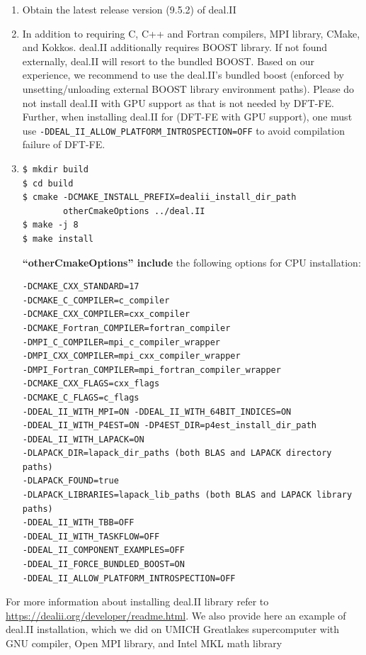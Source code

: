 \begin{enumerate}

\item Obtain the latest release version (9.5.2) of deal.II

\item In addition to requiring C, C++ and Fortran compilers, MPI library, CMake, and Kokkos. deal.II additionally requires BOOST library. If not found externally, deal.II will resort to the bundled BOOST. Based on our experience, we recommend to use the deal.II's bundled boost (enforced by unsetting/unloading external BOOST library environment paths). Please do not install deal.II with GPU support as that is not needed by DFT-FE. Further, when installing deal.II for (DFT-FE with GPU support), one must use \verb|-DDEAL_II_ALLOW_PLATFORM_INTROSPECTION=OFF| to avoid compilation failure of DFT-FE.

\item
\begin{verbatim}
$ mkdir build
$ cd build
$ cmake -DCMAKE_INSTALL_PREFIX=dealii_install_dir_path
        otherCmakeOptions ../deal.II
$ make -j 8        
$ make install
\end{verbatim}
{\bf ``otherCmakeOptions'' include} the following options for CPU installation:
\begin{verbatim}
-DCMAKE_CXX_STANDARD=17
-DCMAKE_C_COMPILER=c_compiler
-DCMAKE_CXX_COMPILER=cxx_compiler
-DCMAKE_Fortran_COMPILER=fortran_compiler
-DMPI_C_COMPILER=mpi_c_compiler_wrapper
-DMPI_CXX_COMPILER=mpi_cxx_compiler_wrapper
-DMPI_Fortran_COMPILER=mpi_fortran_compiler_wrapper
-DCMAKE_CXX_FLAGS=cxx_flags
-DCMAKE_C_FLAGS=c_flags
-DDEAL_II_WITH_MPI=ON -DDEAL_II_WITH_64BIT_INDICES=ON
-DDEAL_II_WITH_P4EST=ON -DP4EST_DIR=p4est_install_dir_path
-DDEAL_II_WITH_LAPACK=ON
-DLAPACK_DIR=lapack_dir_paths (both BLAS and LAPACK directory paths)
-DLAPACK_FOUND=true
-DLAPACK_LIBRARIES=lapack_lib_paths (both BLAS and LAPACK library paths)
-DDEAL_II_WITH_TBB=OFF
-DDEAL_II_WITH_TASKFLOW=OFF
-DDEAL_II_COMPONENT_EXAMPLES=OFF
-DDEAL_II_FORCE_BUNDLED_BOOST=ON
-DDEAL_II_ALLOW_PLATFORM_INTROSPECTION=OFF
\end{verbatim}



\end{enumerate}	
 For more information about installing deal.II library refer to \url{https://dealii.org/developer/readme.html}. We also provide here an example of deal.II installation, which we did on UMICH Greatlakes supercomputer with GNU compiler, Open MPI library, and Intel MKL math library
